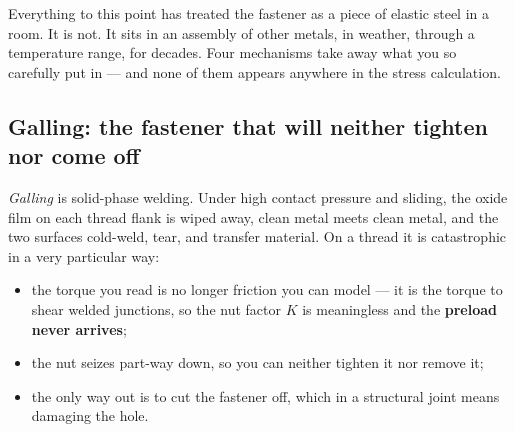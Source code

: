\documentclass[11pt,a4paper]{article}
\begin{document}
Everything to this point has treated the fastener as a piece of elastic steel in a room. It is not.
It sits in an assembly of other metals, in weather, through a temperature range, for decades. Four
mechanisms take away what you so carefully put in --- and none of them appears anywhere in the
stress calculation.

\subsection{Galling: the fastener that will neither tighten nor come off}

\emph{Galling} is solid-phase welding. Under high contact pressure and sliding, the oxide film on
each thread flank is wiped away, clean metal meets clean metal, and the two surfaces cold-weld,
tear, and transfer material. On a thread it is catastrophic in a very particular way:

\begin{itemize}[leftmargin=*,itemsep=1pt]
\item the torque you read is no longer friction you can model --- it is the torque to shear welded
  junctions, so the nut factor $K$ is meaningless and the \textbf{preload never arrives};
\item the nut seizes part-way down, so you can neither tighten it nor remove it;
\item the only way out is to cut the fastener off, which in a structural joint means damaging the
  hole.
\end{itemize}
\end{document}
